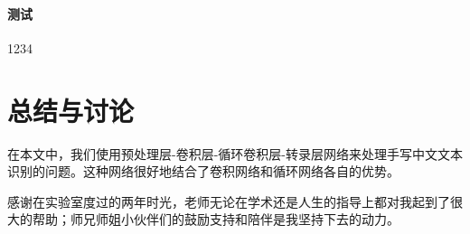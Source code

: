 \documentclass[winfonts, thesis]{njuthesis}
\begin{document}
\subsubsection{测试}
1234

\chapter{总结与讨论}
在本文中，我们使用预处理层-卷积层-循环卷积层-转录层网络来处理手写中文文本识别的问题。这种网络很好地结合了卷积网络和循环网络各自的优势。



\begin{acknowledgement}
  感谢在实验室度过的两年时光，老师无论在学术还是人生的指导上都对我起到了很大的帮助；师兄师姐小伙伴们的鼓励支持和陪伴是我坚持下去的动力。
\end{acknowledgement}

\end{document}
